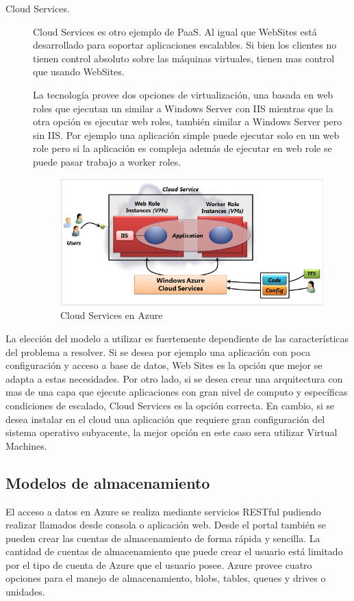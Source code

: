 \begin{description}
\item [Cloud Services.] Cloud Services es otro ejemplo de PaaS. Al igual que WebSites está desarrollado para soportar aplicaciones escalables. Si bien los clientes no tienen control absoluto sobre las máquinas virtuales, tienen mas control que usando WebSites.



La tecnología provee dos opciones de virtualización, una basada en web roles que ejecutan un similar a Windows Server con IIS mientras que la otra opción es ejecutar web roles, también similar a Windows Server pero sin IIS. Por ejemplo una aplicación simple puede ejecutar solo en un web role pero si la aplicación es compleja además de ejecutar en web role se puede pasar trabajo a worker roles.

\begin{figure}[h!]
    \centering
    \includegraphics[width=\columnwidth, keepaspectratio]{_imagenes/azure_cloudservices}
    \caption{Cloud Services en Azure} \label{fig:azure_cloudservices}
\end{figure}

\end{description}


La elección del modelo a utilizar es fuertemente dependiente de las características del problema a resolver. Si se desea por ejemplo una aplicación con poca configuración y acceso a base de datos, Web Sites es la opción que mejor se adapta a estas necesidades. Por otro lado, si se desea crear una arquitectura con mas de una capa que ejecute aplicaciones con gran nivel de computo y específicas condiciones de escalado, Cloud Services es la opción correcta. En cambio, si se desea instalar en el cloud una aplicación que requiere gran configuración del sistema operativo subyacente, la mejor opción en este caso sera utilizar Virtual Machines.

\subsection {Modelos de almacenamiento}
El acceso a datos en Azure se realiza mediante servicios RESTful pudiendo realizar llamados desde consola o aplicación web. Desde el portal también se pueden crear las cuentas de almacenamiento de forma rápida y sencilla. La cantidad de cuentas de almacenamiento que puede crear el usuario está limitado por el tipo de cuenta de Azure que el usuario posee. Azure provee cuatro opciones para el manejo de almacenamiento, blobs, tables, queues y drives o unidades.


